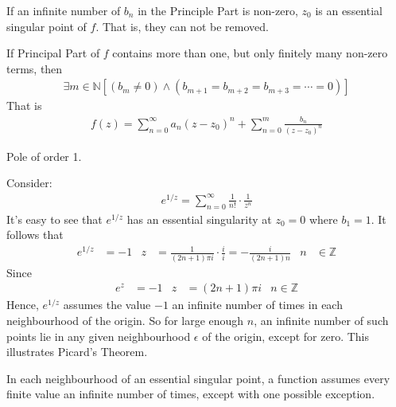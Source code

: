 \documentclass[12pt, english]{book}
\begin{document}
	\begin{definition}
		\label{Essential Singular Points Definition - Complex}
		If an infinite number of \(b_n\) in the Principle Part is non-zero, \(z_0\) is an essential singular point of \(f\). That is, they can not be removed.
	\end{definition}

	\begin{definition}
		\label{Poles of Order m Definition - Complex}
		If Principal Part of \(f\) contains more than one, but only finitely many non-zero terms, then 
		\begin{align*}
			\exists m \in \mathbb{N}[(b_m \neq 0) \land (b_{m+1} = b_{m+2} = b_{m+3} = \cdots = 0)]
		\end{align*} 
		That is 
		\begin{align*}
			f(z) = \sum_{n=0}^{\infty} a_n (z-z_0)^n + \sum_{n=0}^{m} \frac{b_n}{(z-z_0)^n}
		\end{align*}
	\end{definition}

	\begin{definition}
		\label{Simple Pole Definition - Complex}
		Pole of order 1.
	\end{definition}

	\begin{example}
		Consider:
		\begin{align*}
			e^{1/z} = \sum_{n=0}^{\infty} \frac{1}{n!} \cdot \frac{1}{z^n}
		\end{align*}
		It's easy to see that \(e^{1/z}\) has an essential singularity at \(z_0 = 0\) where \(b_1 = 1\). It follows that 
		\begin{align*}
			e^{1/z} &= -1 &
			z &= \frac{1}{(2n + 1)\pi i} \cdot \frac{i}{i} = -\frac{i}{(2n+1)n} & n &\in \mathbb{Z}
		\end{align*}
		Since
		\begin{align*}
			e^{z} &= -1  & z &= (2n+1)\pi i & n \in \mathbb{Z}
		\end{align*}
		Hence, \(e^{1/z}\) assumes the value \(-1\) an infinite number of times in each neighbourhood of the origin. So for large enough \(n\), an infinite number of such points lie in any given neighbourhood \(\epsilon\) of the origin, except for zero. This illustrates Picard's Theorem.
	\end{example}
	
	\begin{theorem}
		In each neighbourhood of an essential singular point, a function assumes every finite value an infinite number of times, except with one possible exception.
	\end{theorem}
\end{document}

